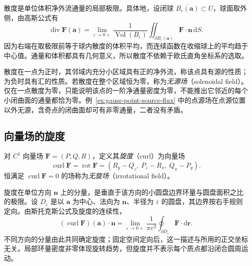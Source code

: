 \documentclass[UTF8,12pt,a4paper,fontset=fandol]{ctexbook}
\begin{document}
散度是单位体积净外流通量的局部极限。具体地，设闭球 $\overline{B_\varepsilon(\boldsymbol a)}\subset U$，球面取外侧，由高斯公式有
\begin{equation}
\label{eq:divergence-local-flux}
    \operatorname{div}\boldsymbol F(\boldsymbol a)
    =\lim_{\varepsilon\to0+}
      \frac1{\operatorname{Vol}(B_\varepsilon)}
      \iint_{\partial B_\varepsilon(\boldsymbol a)}
      \boldsymbol F\cdot\boldsymbol n\,\mathrm dS.
\end{equation}
因为右端在取极限前等于球内散度的体积平均，而连续函数在收缩球上的平均趋于中心值。通量和体积都具有几何意义，所以散度不依赖于欧氏直角坐标系的选取。

散度在一点为正时，其邻域内充分小区域具有正的净外流，称该点具有源的性质；为负时具有汇的性质。若散度在整个区域恒为零，称为\emph{无源场}（solenoidal field）。仅在一点散度为零，只能说明该点的一阶净通量密度为零，不能推出它邻近的每个小闭曲面的通量都恰为零。例~\ref{ex:gauss-point-source-flux} 中的点源场在点源位置以外无源，含奇点的闭曲面却可有非零通量，二者没有矛盾。

\subsection{向量场的旋度}
\label{subsec:curl-of-vector-fields}

\begin{definition}
\label{def:vector-field-curl}
对 $C^1$ 向量场 $\boldsymbol F=(P,Q,R)$，定义其\emph{旋度}（curl）为向量场
\[
    \operatorname{curl}\boldsymbol F
    =\operatorname{rot}\boldsymbol F
    =(R_y-Q_z,\ P_z-R_x,\ Q_x-P_y).
\]
恒满足 $\operatorname{curl}\boldsymbol F=0$ 的场称为\emph{无旋场}（irrotational field）。
\end{definition}

旋度在单位方向 $\boldsymbol n$ 上的分量，是垂直于该方向的小圆盘边界环量与圆盘面积之比的极限。设 $D_\varepsilon$ 是以 $\boldsymbol a$ 为中心、法向为 $\boldsymbol n$、半径为 $\varepsilon$ 的圆盘，其边界按右手规则定向。由斯托克斯公式及旋度的连续性，
\begin{equation}
\label{eq:curl-local-circulation}
    (\operatorname{curl}\boldsymbol F)(\boldsymbol a)\cdot\boldsymbol n
    =\lim_{\varepsilon\to0+}
      \frac1{\pi\varepsilon^2}
      \oint_{\partial D_\varepsilon}\boldsymbol F\cdot\mathrm d\boldsymbol r.
\end{equation}
不同方向的分量由此共同确定旋度；固定空间定向后，这一描述与所用的正交坐标无关。局部环量密度非零体现旋转趋势，但旋度并不表示每个质点都沿闭合圆周运动。
\end{document}

